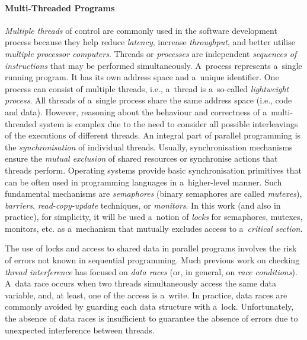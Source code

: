 \paragraph{Multi-Threaded Programs~\cite{atomizer, muzikovskaBP}}
\emph{Multiple threads} of control are commonly used in the software development process because they help reduce \emph{latency}, increase \emph{throughput}, and better utilise \emph{multiple processor computers}. Threads or \emph{processes} are independent \emph{sequences of instructions} that may be performed simultaneously. A~process represents a~single running program. It has its own address space and a~unique identifier. One process can consist of multiple threads, i.e., a~thread is a~so-called \emph{lightweight process}. All threads of a~single process share the same address space (i.e., code and data). However, reasoning about the behaviour and correctness of a~multi-threaded system is complex due to the need to consider all possible interleavings of the executions of different threads. An integral part of parallel programming is the \emph{synchronisation} of individual threads. Usually, synchronisation mechanisms ensure the \emph{mutual exclusion} of shared resources or synchronise actions that threads perform. Operating systems provide basic synchronisation primitives that can be often used in programming languages in a~higher-level manner. Such fundamental mechanisms are \emph{semaphores} (binary semaphores are called \emph{mutexes}), \emph{barriers}, \emph{read-copy-update} techniques, or \emph{monitors}. In this work (and also in practice), for simplicity, it will be used a~notion of \emph{locks} for semaphores, mutexes, monitors, etc. as a~mechanism that mutually excludes access to a~\emph{critical section}.

The use of locks and access to shared data in parallel programs involves the risk of errors not known in sequential programming. Much previous work on checking \emph{thread interference} has focused on \emph{data races} (or, in general, on \emph{race conditions}). A~data race occurs when two threads simultaneously access the same data variable, and, at least, one of the access is a~write. In practice, data races are commonly avoided by guarding each data structure with a~lock. Unfortunately, the absence of data races is insufficient to guarantee the absence of errors due to unexpected interference between threads.~\cite{atomizer, atomicityOOP}

